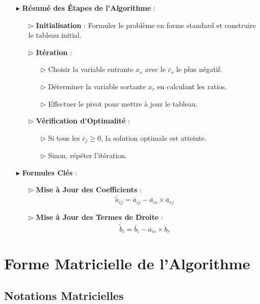 \documentclass{report}
\begin{document}
\begin{multicols*}{2}
\begin{itemize}
    \item[$\blacktriangleright$] \textbf{Résumé des Étapes de l'Algorithme} :
    \begin{enumerate}
        \item[$\rhd$] \textbf{Initialisation} : Formuler le problème en forme standard et construire le tableau initial.
        \item[$\rhd$] \textbf{Itération} :
        \begin{enumerate}
            \item[$\rhd$] Choisir la variable entrante \( x_s \) avec le \( \overline{c}_s \) le plus négatif.
            \item[$\rhd$] Déterminer la variable sortante \( x_r \) en calculant les ratios.
            \item[$\rhd$] Effectuer le pivot pour mettre à jour le tableau.
        \end{enumerate}
        \item[$\rhd$] \textbf{Vérification d'Optimalité} :
        \begin{itemize}
            \item[$\rhd$] Si tous les \( \overline{c}_j \geq 0 \), la solution optimale est atteinte.
            \item[$\rhd$] Sinon, répéter l'itération.
        \end{itemize}
    \end{enumerate}

    \item[$\blacktriangleright$] \textbf{Formules Clés} :
    \begin{itemize}
        \item[$\rhd$] \textbf{Mise à Jour des Coefficients} :
        \[
            \boxed{\overline{\tilde{a}}_{ij} = \overline{a}_{ij} - \overline{a}_{is} \times \overline{a}_{rj}}
        \]
        \item[$\rhd$] \textbf{Mise à Jour des Termes de Droite} :
        \[
            \boxed{\overline{\tilde{b}}_i = \overline{b}_i - \overline{a}_{is} \times \overline{b}_r}
        \]
    \end{itemize}
\end{itemize}
\section{Forme Matricielle de l'Algorithme}

\subsection{Notations Matricielles}


\end{multicols*}
\end{document}
